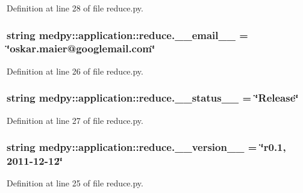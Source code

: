 Definition at line 28 of file reduce.py.

\hypertarget{namespacemedpy_1_1application_1_1reduce_a5bc4e8875071312e12c147d607a1cb2f}{
\subsubsection[{\_\-\_\-email\_\-\_\-}]{\setlength{\rightskip}{0pt plus 5cm}string {\bf medpy::application::reduce.\_\-\_\-email\_\-\_\-} = \char`\"{}oskar.maier@googlemail.com\char`\"{}}}
\label{namespacemedpy_1_1application_1_1reduce_a5bc4e8875071312e12c147d607a1cb2f}


Definition at line 26 of file reduce.py.

\hypertarget{namespacemedpy_1_1application_1_1reduce_afb819b48190291c426350672a1466ce7}{
\subsubsection[{\_\-\_\-status\_\-\_\-}]{\setlength{\rightskip}{0pt plus 5cm}string {\bf medpy::application::reduce.\_\-\_\-status\_\-\_\-} = \char`\"{}Release\char`\"{}}}
\label{namespacemedpy_1_1application_1_1reduce_afb819b48190291c426350672a1466ce7}


Definition at line 27 of file reduce.py.

\hypertarget{namespacemedpy_1_1application_1_1reduce_ab7d6b705d72b2bf03b8fc06d12d57d1c}{
\subsubsection[{\_\-\_\-version\_\-\_\-}]{\setlength{\rightskip}{0pt plus 5cm}string {\bf medpy::application::reduce.\_\-\_\-version\_\-\_\-} = \char`\"{}r0.1, 2011-\/12-\/12\char`\"{}}}
\label{namespacemedpy_1_1application_1_1reduce_ab7d6b705d72b2bf03b8fc06d12d57d1c}


Definition at line 25 of file reduce.py.


